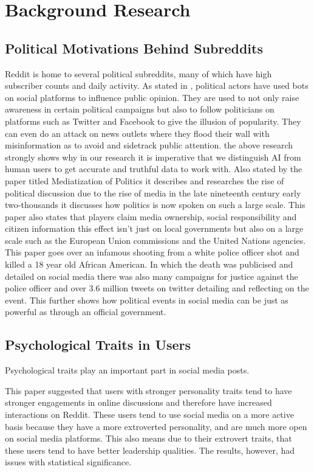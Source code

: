 \chapter{Background Research}\label{ch:Background}

\section{Political Motivations Behind Subreddits}
Reddit is home to several political subreddits, many of which have high subscriber counts and daily activity. As stated in \cite{5}, political actors have used bots on social platforms to influence public opinion. They are used to not only raise awareness in certain political campaigns but also to follow politicians on platforms such as Twitter and Facebook to give the illusion of popularity. They can even do an attack on news outlets where they flood their wall with misinformation as to avoid and sidetrack public attention. \cite{5} the above research strongly shows why in our research it is imperative that we distinguish AI from human users to get accurate and truthful data to work with. Also stated by the paper titled Mediatization of Politics it describes and researches the rise of political discussion due to the rise of media in the late nineteenth century early two-thousands it discusses how politics is now spoken on such a large scale. \cite{10} This paper \cite{11} also states that players claim media ownership, social responsibility and citizen information this effect isn’t just on local governments but also on a large scale such as the European Union commissions and the United Nations agencies. This paper \cite{12} goes over an infamous shooting from a white police officer shot and killed a 18 year old African American. In which the death was publicised and detailed on social media there was also many campaigns for justice against the police officer and over 3.6 million tweets on twitter detailing and reflecting on the event. This further shows how political events in social media can be just as powerful as through an official government.

\section{Psychological Traits in Users}
Psychological traits play an important part in social media posts.

This paper \cite{1} suggested that users with stronger personality traits tend to have stronger engagements in online discussions and therefore have increased interactions on Reddit. These users tend to use social media on a more active basis because they have a more extroverted personality, and are much more open on social media platforms. This also means due to their extrovert traits, that these users tend to have better leadership qualities. The results, however, had issues with statistical significance.

